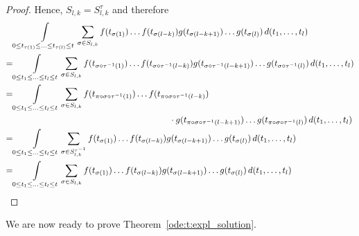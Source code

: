 \begin{proof}
\noindent
Hence, $S_{l,k} = S^\tau_{l,k}$ and therefore
\small
\begin{align*}
& \int\limits_{0 \leq t_{\tau(1)} \leq \ldots \leq t_{\tau(l)} \leq t}
	\sum_{\sigma \in S_{l,k}} 
	f(t_{\sigma(1)}) \ldots f(t_{\sigma(l-k)}) 
	g(t_{\sigma(l-k+1)}) \ldots g(t_{\sigma(l)})
	\,d(t_1,\ldots,t_l) \\
= & \int\limits_{0 \leq t_{1} \leq \ldots \leq t_{l} \leq t}
	\sum_{\sigma \in S_{l,k}} 
	f(t_{\sigma \circ \tau^{-1}(1)}) \ldots f(t_{\sigma \circ \tau^{-1}(l-k)}) 
	g(t_{\sigma \circ \tau^{-1}(l-k+1)}) \ldots g(t_{\sigma \circ \tau^{-1}(l)})
	\,d(t_1,\ldots,t_l) \\
= & \int\limits_{0 \leq t_{1} \leq \ldots \leq t_{l} \leq t}
	\sum_{\sigma \in S_{l,k}} 
	f(t_{\pi \circ \sigma \circ \tau^{-1}(1)}) \ldots f(t_{\pi \circ \sigma \circ \tau^{-1}(l-k)}) \\
  & \qquad \qquad \qquad \qquad \qquad \qquad \qquad \qquad \qquad
	\cdot g(t_{\pi \circ \sigma \circ \tau^{-1}(l-k+1)}) \ldots g(t_{\pi \circ \sigma \circ
	\tau^{-1}(l)}) \,d(t_1,\ldots,t_l) \\
= & \int\limits_{0 \leq t_{1} \leq \ldots \leq t_{l} \leq t}
	\sum_{\sigma \in S^{\tau^{-1}}_{l,k}} 
	f(t_{\sigma(1)}) \ldots f(t_{\sigma(l-k)}) 
	g(t_{\sigma(l-k+1)}) \ldots g(t_{\sigma(l)})
	\,d(t_1,\ldots,t_l) \\
= & \int\limits_{0 \leq t_{1} \leq \ldots \leq t_{l} \leq t}
	\sum_{\sigma \in S_{l,k}} 
	f(t_{\sigma(1)}) \ldots f(t_{\sigma(l-k)}) 
	g(t_{\sigma(l-k+1)}) \ldots g(t_{\sigma(l)})
	\,d(t_1,\ldots,t_l) \qedhere
\end{align*}
\normalsize
\end{proof}

\noindent
We are now ready to prove Theorem~\ref{ode:t:expl_solution}.

